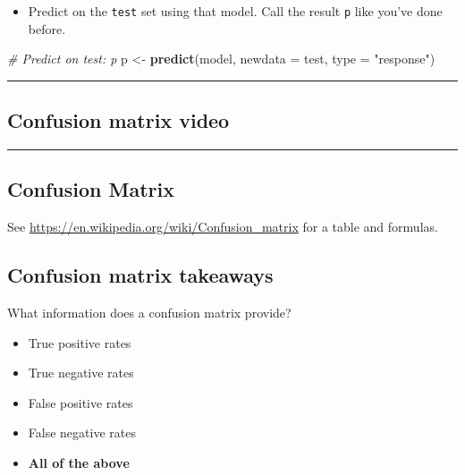 \documentclass[]{book}
\newenvironment{Shaded}{\begin{snugshade}}{\end{snugshade}}
\newcommand{\KeywordTok}[1]{\textcolor[rgb]{0.13,0.29,0.53}{\textbf{#1}}}
\newcommand{\DataTypeTok}[1]{\textcolor[rgb]{0.13,0.29,0.53}{#1}}
\newcommand{\StringTok}[1]{\textcolor[rgb]{0.31,0.60,0.02}{#1}}
\newcommand{\CommentTok}[1]{\textcolor[rgb]{0.56,0.35,0.01}{\textit{#1}}}
\newcommand{\NormalTok}[1]{#1}
\providecommand{\tightlist}{%
  \setlength{\itemsep}{0pt}\setlength{\parskip}{0pt}}
\begin{document}
\begin{itemize}
\tightlist
\item
  Predict on the \texttt{test} set using that model. Call the result
  \texttt{p} like you've done before.
\end{itemize}

\begin{Shaded}
\begin{Highlighting}[]
\CommentTok{# Predict on test: p}
\NormalTok{p <-}\StringTok{ }\KeywordTok{predict}\NormalTok{(model, }\DataTypeTok{newdata =}\NormalTok{ test, }\DataTypeTok{type =} \StringTok{"response"}\NormalTok{)}
\end{Highlighting}
\end{Shaded}

\begin{center}\rule{0.5\linewidth}{\linethickness}\end{center}

\subsection*{Confusion matrix video}\label{confusion-matrix-video}

\begin{center}\rule{0.5\linewidth}{\linethickness}\end{center}

\subsection*{Confusion Matrix}\label{confusion-matrix}

See \url{https://en.wikipedia.org/wiki/Confusion_matrix} for a table and
formulas.

\subsection*{Confusion matrix
takeaways}\label{confusion-matrix-takeaways}

What information does a confusion matrix provide?

\begin{itemize}
\item
  True positive rates
\item
  True negative rates
\item
  False positive rates
\item
  False negative rates
\item
  \textbf{All of the above}
\end{itemize}
\end{document}
